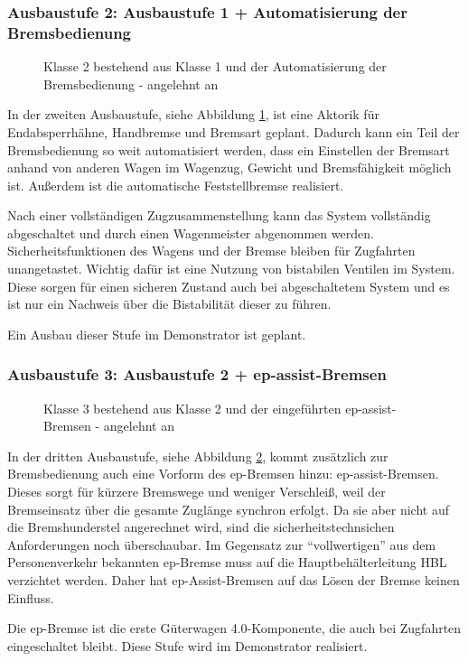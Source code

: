 \subsubsection{Ausbaustufe 2: Ausbaustufe 1 + Automatisierung der Bremsbedienung}
\begin{figure}[htbp] 
    
    \caption{Klasse 2 bestehend aus Klasse 1 und der Automatisierung der Bremsbedienung - angelehnt an \cite{ETR_3}}
    \label{fig:Klasse2}
\end{figure} 
In der zweiten Ausbaustufe, siehe Abbildung \ref{fig:Klasse2}, ist eine Aktorik für Endabsperrhähne, Handbremse und \gls{Bremsart} geplant. Dadurch kann ein Teil der Bremsbedienung so weit automatisiert werden, dass ein Einstellen der \gls{Bremsart} anhand von anderen Wagen im \gls{Wagenzug}, Gewicht und Bremsfähigkeit möglich ist. Außerdem ist die automatische Feststellbremse realisiert.\par
Nach einer vollständigen Zugzusammenstellung kann das System vollständig abgeschaltet und durch einen Wagenmeister abgenommen werden. Sicherheitsfunktionen des Wagens und der Bremse bleiben für Zugfahrten unangetastet. Wichtig dafür ist eine Nutzung von bistabilen Ventilen im System. Diese sorgen für einen sicheren Zustand auch bei abgeschaltetem System und es ist nur ein Nachweis über die Bistabilität dieser zu führen.\par
Ein Ausbau dieser Stufe im Demonstrator ist geplant.

\subsubsection{Ausbaustufe 3: Ausbaustufe 2 + ep-assist-Bremsen}
\begin{figure}[htbp] 
    
    \caption{Klasse 3 bestehend aus Klasse 2 und der eingeführten ep-assist-Bremsen - angelehnt an \cite{ETR_3}}
    \label{fig:Klasse3}
\end{figure} 
In der dritten Ausbaustufe, siehe Abbildung \ref{fig:Klasse3}, kommt zusätzlich zur Bremsbedienung auch eine Vorform des \gls{ep-Bremsen} hinzu: \gls{ep-assist-Bremsen}. Dieses sorgt für kürzere Bremswege und weniger Verschleiß, weil der Bremseinsatz über die gesamte Zuglänge synchron erfolgt. Da sie aber nicht auf die Bremshunderstel angerechnet wird, sind die sicherheitstechnsichen Anforderungen noch überschaubar. Im Gegensatz zur "`vollwertigen"' aus dem Personenverkehr bekannten ep-Bremse muss auf die Hauptbehälterleitung HBL verzichtet werden. Daher hat ep-Assist-Bremsen auf das Lösen der Bremse keinen Einfluss.\par
Die ep-Bremse ist die erste Güterwagen 4.0-Komponente, die auch bei Zugfahrten eingeschaltet bleibt. Diese Stufe wird im Demonstrator realisiert.

